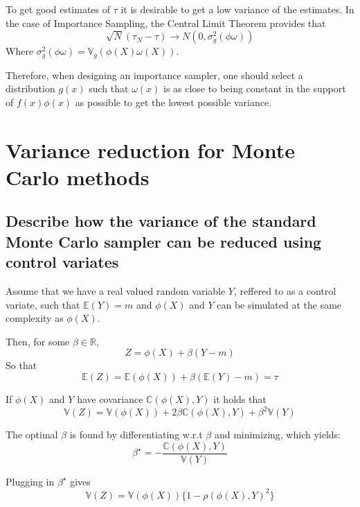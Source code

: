 \documentclass[a4paper]{article}
\begin{document}
To get good estimates of $\tau$ it is desirable to get a low variance of the estimates. In the case of Importance Sampling, the Central Limit Theorem provides that
\begin{equation}
    \sqrt{N}(\tau_N-\tau) \rightarrow N(0,\sigma_g^2(\phi\omega))
\end{equation}
Where $\sigma_g^2(\phi\omega) = \mathbb{V}_g(\phi(X)\omega(X))$.

Therefore, when designing an importance sampler, one should select a distribution $g(x)$ such that $\omega(x)$ is as close to being constant in the support of $f(x)\phi(x)$ as possible to get the lowest possible variance.

\newpage
\section{Variance reduction for Monte Carlo methods}

\subsection[Control Variates]{Describe how the variance of the standard Monte Carlo sampler can be reduced using control variates}
Assume that we have a real valued random variable $Y$, reffered to as a control variate, such that $\mathbb{E}(Y) = m$ and $\phi(X)$ and $Y$ can be simulated at the same complexity as $\phi(X)$.

Then, for some $\beta \in \mathbb{R}$,
\begin{equation}
    Z = \phi(X) + \beta(Y-m)
\end{equation}
So that
\begin{equation}
    \mathbb{E}(Z) = \mathbb{E}(\phi(X)) + \beta(\mathbb{E}(Y)-m) = \tau
\end{equation}

If $\phi(X)$ and $Y$ have covariance $\mathbb{C}(\phi(X),Y)$ it holds that
\begin{equation}
    \mathbb{V}(Z) = \mathbb{V}(\phi(X)) + 2\beta\mathbb{C}(\phi(X),Y) + \beta^2\mathbb{V}(Y)
\end{equation}

The optimal $\beta$ is found by differentiating w.r.t $\beta$ and minimizing, which yields:
\begin{equation}
    \beta^\star = -\frac{\mathbb{C}(\phi(X),Y)}{\mathbb{V}(Y)}
\end{equation}

Plugging in $\beta^\star$ gives
\begin{equation}
    \mathbb{V}(Z) = \mathbb{V}(\phi(X))\{1-\rho(\phi(X),Y)^2\}
\end{equation}
\end{document}
